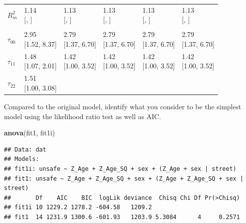 \documentclass[]{article}
\newenvironment{Shaded}{\begin{snugshade}}{\end{snugshade}}
\newcommand{\KeywordTok}[1]{\textcolor[rgb]{0.13,0.29,0.53}{\textbf{#1}}}
\newcommand{\NormalTok}[1]{#1}
\begin{document}
\begin{table}[H]
\begin{tabular}{llllll}
$R^2_m$ & \makecell{1.14 \\ {[, ]}} & \makecell{1.13 \\ {[, ]}} & \makecell{1.13 \\ {[, ]}} & \makecell{1.13 \\ {[, ]}} & \makecell{1.13 \\ {[, ]}}\\
\addlinespace[0.3em]
\multicolumn{6}{l}{\textbf{Random}}\\
\hspace{1em}$\tau_{00}$ & \makecell{2.95 \\ {[1.52, 8.37]}} & \makecell{2.79 \\ {[1.37, 6.70]}} & \makecell{2.79 \\ {[1.37, 6.70]}} & \makecell{2.79 \\ {[1.37, 6.70]}} & \makecell{2.79 \\ {[1.37, 6.70]}}\\
\hspace{1em}$\tau_{11}$ & \makecell{1.48 \\ {[1.07, 2.01]}} & \makecell{1.42 \\ {[1.00, 3.52]}} & \makecell{1.42 \\ {[1.00, 3.52]}} & \makecell{1.42 \\ {[1.00, 3.52]}} & \makecell{1.42 \\ {[1.00, 3.52]}}\\
\hspace{1em}$\tau_{22}$ & \makecell{1.51 \\ {[1.00, 3.08]}} &  &  &  & \\
\bottomrule
\end{tabular}
\end{table}

Compared to the original model, identify what you consider to be the
simplest model using the likelihood ratio test as well as AIC.

\begin{Shaded}
\begin{Highlighting}[]
\KeywordTok{anova}\NormalTok{(fit1, fit1i)}
\end{Highlighting}
\end{Shaded}

\begin{verbatim}
## Data: dat
## Models:
## fit1i: unsafe ~ Z_Age + Z_Age_SQ + sex + (Z_Age + sex | street)
## fit1: unsafe ~ Z_Age + Z_Age_SQ + sex + (Z_Age + Z_Age_SQ + sex | street)
##       Df    AIC    BIC  logLik deviance  Chisq Chi Df Pr(>Chisq)
## fit1i 10 1229.2 1278.2 -604.58   1209.2                         
## fit1  14 1231.9 1300.6 -601.93   1203.9 5.3084      4     0.2571
\end{verbatim}
\end{document}
